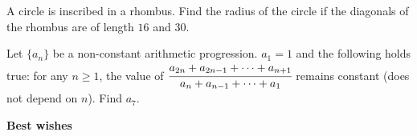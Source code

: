 \documentclass[12pt, a4paper]{exam}
\begin{document}
\begin{questions}
	\pointsdroppedatright
%

	\question
	A circle is inscribed in a rhombus. Find the radius of the circle if the diagonals of the rhombus are of length $16$ and $30$.

	\question
	Let $\{a_n\}$ be a non-constant arithmetic progression. $a_1 = 1$ and the following holds true: for any $n \geq 1$, the value of $ \cfrac{a_{2n}+a_{2n-1}+\cdots+a_{n+1}}{a_n+a_{n-1}+\cdots+a_1} $ remains constant (does not depend on $n$). Find $a_7$.
	
\end{questions}
\vspace{0.75in}
{\large \bfseries Best wishes}
\end{document}
